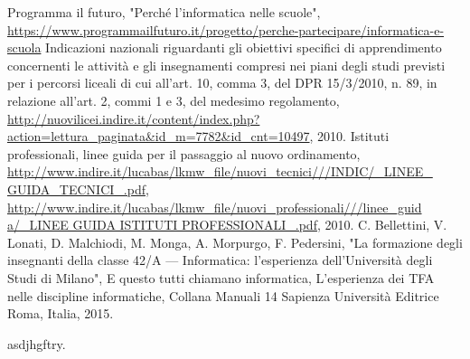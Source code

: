\documentclass[12pt]{report}
\begin{document}
\begin{thebibliography}{00}
Programma il futuro, "Perché l'informatica nelle scuole",
\url{https://www.programmailfuturo.it/progetto/perche-partecipare/informatica-e-scuola}
%
Indicazioni nazionali riguardanti gli obiettivi specifici di apprendimento concernenti le attività e gli insegnamenti compresi nei piani degli studi previsti per i percorsi liceali di cui all'art. 10, comma 3, del DPR 15/3/2010, n. 89, in relazione all'art. 2, commi 1 e 3, del medesimo regolamento, \url{http://nuovilicei.indire.it/content/index.php?action=lettura_paginata&id_m=7782&id_cnt=10497}, 2010.
%
Istituti professionali, linee guida per il passaggio al nuovo ordinamento, \url{http://www.indire.it/lucabas/lkmw_file/nuovi_tecnici///INDIC/_LINEE_ GUIDA_TECNICI_.pdf}, \url{http://www.indire.it/lucabas/lkmw_file/nuovi_professionali///linee_guid a/_LINEE GUIDA ISTITUTI PROFESSIONALI_.pdf}, 2010.
%
C. Bellettini, V. Lonati, D. Malchiodi, M. Monga, A. Morpurgo, F. Pedersini, "La formazione degli insegnanti della classe 42/A --- Informatica: l'esperienza dell'Università degli Studi di Milano", 
E questo tutti chiamano informatica, L'esperienza dei TFA nelle discipline informatiche, 
Collana Manuali 14 Sapienza Università Editrice Roma, Italia,
2015.
\end{thebibliography}
% 
%
asdjhgftry.
\end{document}
